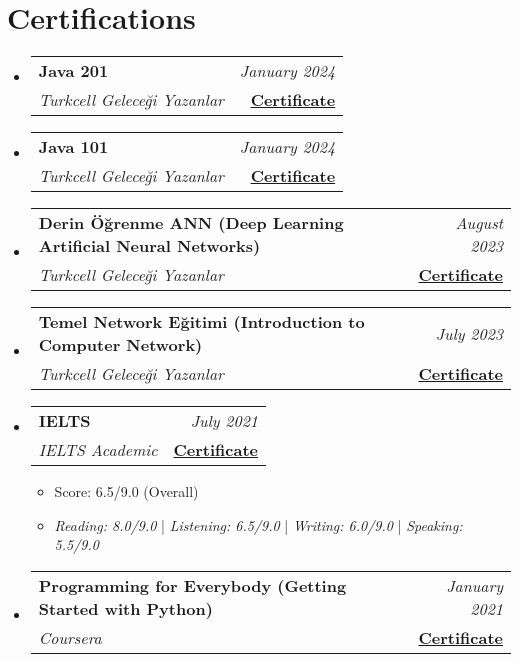 \documentclass[a4paper,11pt]{article}
\makeatletter
\newcommand{\resumeSubheading}[4]{
\vspace{0.5mm}\item
    \begin{tabular*}{0.98\textwidth}[t]{l@{\extracolsep{\fill}}r}
    \textbf{#1} & \textit{\footnotesize{#4}} \\
    \textit{\footnotesize{#3}} &  \footnotesize{#2} \\
    \end{tabular*}\vspace{-2.4mm}
}
\newcommand{\resumeSubHeadingListStart}{\begin{itemize}[leftmargin=*,labelsep=0mm]}
\newcommand{\resumeItemListStart}{\begin{justify}\begin{itemize}[leftmargin=3ex, rightmargin=2ex, noitemsep,labelsep=1.2mm,itemsep=0mm]\small}
\newcommand{\resumeSubHeadingListEnd}{\end{itemize}\vspace{2mm}}
\newcommand{\resumeItemListEnd}{\end{itemize}\end{justify}\vspace{-2mm}}
\makeatother
\begin{document}
\section{\textbf{Certifications}}
    \resumeSubHeadingListStart
        \resumeSubheading
            {Java 201}{\href{https://drive.google.com/file/d/1vD8vmiyYwKvS5aYOlA2uqjPI9n-wBM9T/view}{\textbf{\color{blue}Certificate}}}
            {Turkcell Geleceği Yazanlar}{January 2024}
        \resumeSubheading
            {Java 101}{\href{https://drive.google.com/file/d/1zdZCYs2E5Qpped_xJRrILFj2uN1enebY/view}{\textbf{\color{blue}Certificate}}}
            {Turkcell Geleceği Yazanlar}{January 2024}
        \resumeSubheading
            {Derin Öğrenme ANN (Deep Learning Artificial Neural Networks)}{\href{https://drive.google.com/file/d/1c3lkospGb5_XNwzyL9Z_lm4VM06TJs1d/view}{\textbf{\color{blue}Certificate}}}
            {Turkcell Geleceği Yazanlar}{August 2023}
        \resumeSubheading
            {Temel Network Eğitimi (Introduction to Computer Network)}{\href{https://drive.google.com/file/d/16RW97XUNj9QyksCpjlbETMRPHho53KJg/view}{\textbf{\color{blue}Certificate}}}
            {Turkcell Geleceği Yazanlar}{July 2023}
        \resumeSubheading
            {IELTS}{\href{https://drive.google.com/file/d/1jKMRSpP3VZ0Qj-F9RZ2jfN7uosiKkEt6/view}{\textbf{\color{blue}Certificate}}}
            {IELTS Academic}{July 2021}
                \resumeItemListStart
                    \item {Score: 6.5/9.0 (Overall)}
                    \item {\emph{Reading: 8.0/9.0} | \emph{Listening: 6.5/9.0} | \emph{Writing: 6.0/9.0} | \emph{Speaking: 5.5/9.0} }
                \resumeItemListEnd
        \resumeSubheading
            {Programming for Everybody (Getting Started with Python)}{\href{https://www.coursera.org/account/accomplishments/certificate/6EU4LEV48RQX}{\textbf{\color{blue}Certificate}}}
            {Coursera}{January 2021}
    \resumeSubHeadingListEnd
\vspace{-5.5mm}


\vfill
{}
\end{document}
